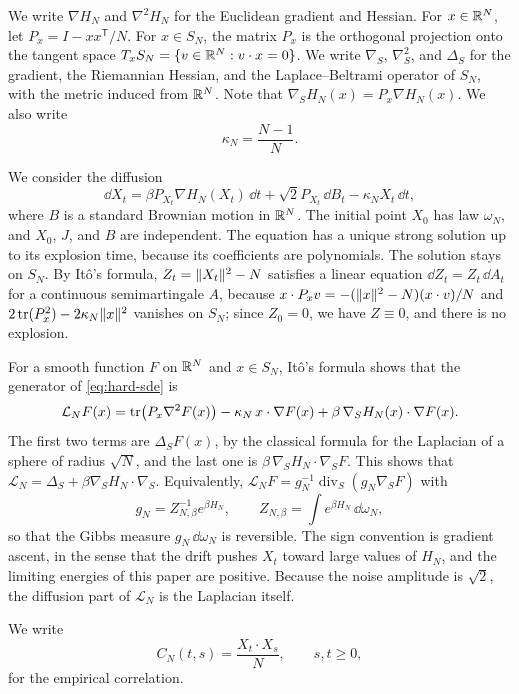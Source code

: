We write $\nabla H_N$ and $\nabla^2H_N$ for the Euclidean gradient and Hessian. For $x\in\mathbb R^N$, let $P_x=I-xx^{\mathsf T}/N$. For $x\in S_N$, the matrix $P_x$ is the orthogonal projection onto the tangent space $T_xS_N=\{v\in\mathbb R^N:v\cdot x=0\}$. We write $\nabla_S$, $\nabla_S^2$, and $\Delta_S$ for the gradient, the Riemannian Hessian, and the Laplace--Beltrami operator of $S_N$, with the metric induced from $\mathbb R^N$. Note that $\nabla_SH_N(x)=P_x\nabla H_N(x)$. We also write
\[
 \kappa_N=\frac{N-1}{N}.
\]

We consider the diffusion
\begin{equation}
 \dd X_t=\beta P_{X_t}\nabla H_N(X_t)\,\dd t
 +\sqrt2P_{X_t}\,\dd B_t-\kappa_NX_t\,\dd t,
 \label{eq:hard-sde}
\end{equation}
where $B$ is a standard Brownian motion in $\mathbb R^N$. The initial point $X_0$ has law $\omega_N$, and $X_0$, $J$, and $B$ are independent. The equation has a unique strong solution up to its explosion time, because its coefficients are polynomials. The solution stays on $S_N$. By It\^o's formula, $Z_t=\lVert X_t\rVert^2-N$ satisfies a linear equation $\dd Z_t=Z_t\,\dd A_t$ for a continuous semimartingale $A$, because $x\cdot P_xv=-(\lVert x\rVert^2-N)(x\cdot v)/N$ and $2\operatorname{tr}(P_x^2)-2\kappa_N\lVert x\rVert^2$ vanishes on $S_N$; since $Z_0=0$, we have $Z\equiv0$, and there is no explosion.

For a smooth function $F$ on $\mathbb R^N$ and $x\in S_N$, It\^o's formula shows that the generator of \eqref{eq:hard-sde} is
\begin{equation}\label{eq:generator}
 \mathcal L_NF(x)=\operatorname{tr}\bigl(P_x\nabla^2F(x)\bigr)-\kappa_N\,x\cdot\nabla F(x)
 +\beta\,\nabla_SH_N(x)\cdot\nabla F(x).
\end{equation}
The first two terms are $\Delta_SF(x)$, by the classical formula for the Laplacian of a sphere of radius $\sqrt N$, and the last one is $\beta\,\nabla_SH_N\cdot\nabla_SF$. This shows that $\mathcal L_N=\Delta_S+\beta\nabla_SH_N\cdot\nabla_S$. Equivalently, $\mathcal L_NF=g_N^{-1}\operatorname{div}_S(g_N\nabla_SF)$ with
\[
 g_N=Z_{N,\beta}^{-1}e^{\beta H_N},\qquad Z_{N,\beta}=\int e^{\beta H_N}\,\dd\omega_N,
\]
so that the Gibbs measure $g_N\,\dd\omega_N$ is reversible. The sign convention is gradient ascent, in the sense that the drift pushes $X_t$ toward large values of $H_N$, and the limiting energies of this paper are positive. Because the noise amplitude is $\sqrt2$, the diffusion part of $\mathcal L_N$ is the Laplacian itself.

We write
\[
 C_N(t,s)=\frac{X_t\cdot X_s}N,\qquad s,t\ge0,
\]
for the empirical correlation.

